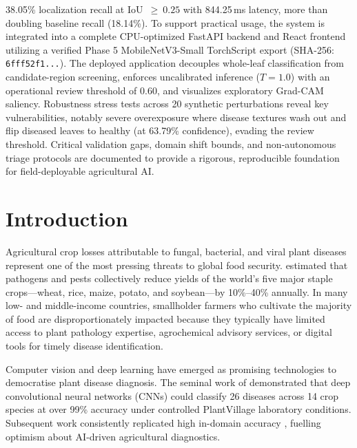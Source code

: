 \documentclass[pdflatex,sn-mathphys-num]{sn-jnl}
\theoremstyle{thmstyleone}%
\theoremstyle{thmstyletwo}%
\theoremstyle{thmstylethree}%
\begin{document}
{38.05\% localization recall at IoU~$\geq~0.25$ with 844.25\,ms latency, more than doubling baseline recall (18.14\%).
To support practical usage, the system is integrated into a complete CPU-optimized FastAPI backend and React frontend
utilizing a verified Phase 5 MobileNetV3-Small TorchScript export (SHA-256: \texttt{6fff52f1...}). The deployed application
decouples whole-leaf classification from candidate-region screening, enforces uncalibrated inference ($T=1.0$) with an
operational review threshold of 0.60, and visualizes exploratory Grad-CAM saliency. Robustness stress tests across 20 synthetic
perturbations reveal key vulnerabilities, notably severe overexposure where disease textures wash out and flip diseased leaves to
healthy (at 63.79\% confidence), evading the review threshold. Critical validation gaps, domain shift bounds, and non-autonomous
triage protocols are documented to provide a rigorous, reproducible foundation for field-deployable agricultural AI.
}


\maketitle


\section{Introduction}
\label{sec:introduction}

Agricultural crop losses attributable to fungal, bacterial, and viral plant diseases
represent one of the most pressing threats to global food security. \citet{savary2019burden}
estimated that pathogens and pests collectively reduce yields of the world's five major
staple crops---wheat, rice, maize, potato, and soybean---by 10\%–40\% annually. In many
low- and middle-income countries, smallholder farmers who cultivate the majority of food
are disproportionately impacted because they typically have limited access to plant
pathology expertise, agrochemical advisory services, or digital tools for timely disease
identification.

Computer vision and deep learning have emerged as promising technologies to democratise
plant disease diagnosis. The seminal work of \citet{mohanty2016} demonstrated that deep
convolutional neural networks (CNNs) could classify 26 diseases across 14 crop species
at over 99\% accuracy under controlled PlantVillage \citep{hughes2015plantvillage}
laboratory conditions. Subsequent work consistently replicated high in-domain accuracy
\citep{ferentinos2018deep,chen2020identification,atila2021plant}, fuelling optimism about
AI-driven agricultural diagnostics.
\end{document}
